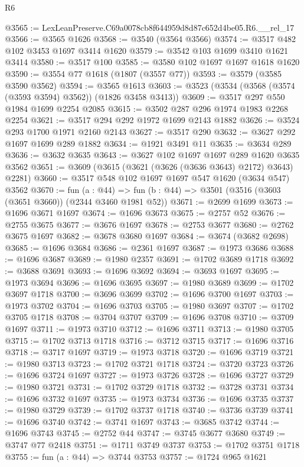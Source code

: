 \begin{lexlean}{R6}
\begin{coremodule}
@3565 := LexLeanPreserve.C69a0078cb8f644959d8d87c652d4be05.R6.__rel_17
@3566 := @3565 @1626
@3568 := @3540 (@3564 @3566)
@3574 := @3517 @482 @102 @3453 @1697 @3414 @1620
@3579 := @3542 @103 @1699 @3410 @1621 @3414
@3580 := @3517 @100
@3585 := @3580 @102 @1697 @1697 @1618 @1620
@3590 := @3554 @77 @1618 (@1807 (@3557 @77))
@3593 := @3579 (@3585 @3590 @3562)
@3594 := @3565 @1613
@3603 := @3523 (@3534 (@3568 (@3574 (@3593 @3594) @3562)) (@1826 @3458 @3413))
@3609 := @3517 @297 @550 @1984 @1699 @2254 @2085
@3615 := @3502 @287 @296 @1974 @1983 @2268 @2254
@3621 := @3517 @294 @292 @1972 @1699 @2143 @1882
@3626 := @3524 @293 @1700 @1971 @2160 @2143
@3627 := @3517 @290
@3632 := @3627 @292 @1697 @1699 @289 @1882
@3634 := @1921 @3491 @11
@3635 := @3634 @289
@3636 := @3632 @3635
@3643 := @3627 @102 @1697 @1697 @289 @1620 @3635 @3562
@3651 := @3609 (@3615 (@3621 (@3626 (@3636 @3643) @2172) @3643) @2281)
@3660 := @3517 @548 @102 @1697 @1697 @547 @1620 (@3634 @547) @3562
@3670 := fun (a : @44) =>
  fun (b : @44) => @3501 (@3516 (@3603 (@3651 @3660)) (@2344 @3460 @1981 @52))
@3671 := @2699 @1699
@3673 := @1696 @3671 @1697
@3674 := @1696 @3673
@3675 := @2757 @52
@3676 := @2755 @3675
@3677 := @3676 @1697
@3678 := @2753 @3677
@3680 := @2762 @3675 @1697
@3682 := @3678 @3680 @1697
@3684 := @3674 (@3682 @2698)
@3685 := @1696 @3684
@3686 := @2361 @1697
@3687 := @1973 @3686
@3688 := @1696 @3687
@3689 := @1980 @2357
@3691 := @1702 @3689 @1718
@3692 := @3688 @3691
@3693 := @1696 @3692
@3694 := @3693 @1697
@3695 := @1973 @3694
@3696 := @1696 @3695
@3697 := @1980 @3689
@3699 := @1702 @3697 @1718
@3700 := @3696 @3699
@3702 := @1696 @3700 @1697
@3703 := @1973 @3702
@3704 := @1696 @3703
@3705 := @1980 @3697
@3707 := @1702 @3705 @1718
@3708 := @3704 @3707
@3709 := @1696 @3708
@3710 := @3709 @1697
@3711 := @1973 @3710
@3712 := @1696 @3711
@3713 := @1980 @3705
@3715 := @1702 @3713 @1718
@3716 := @3712 @3715
@3717 := @1696 @3716
@3718 := @3717 @1697
@3719 := @1973 @3718
@3720 := @1696 @3719
@3721 := @1980 @3713
@3723 := @1702 @3721 @1718
@3724 := @3720 @3723
@3726 := @1696 @3724 @1697
@3727 := @1973 @3726
@3728 := @1696 @3727
@3729 := @1980 @3721
@3731 := @1702 @3729 @1718
@3732 := @3728 @3731
@3734 := @1696 @3732 @1697
@3735 := @1973 @3734
@3736 := @1696 @3735
@3737 := @1980 @3729
@3739 := @1702 @3737 @1718
@3740 := @3736 @3739
@3741 := @1696 @3740
@3742 := @3741 @1697
@3743 := @3685 @3742
@3744 := @1696 @3743
@3745 := @2752 @44
@3747 := @3745 @3677 @3680
@3749 := @3747 @77 @2418
@3751 := @1711 @3749 @3737
@3753 := @1702 @3751 @1718
@3755 := fun (a : @44) => @3744 @3753
@3757 := @1724 @965 @1621

\end{coremodule}
\end{lexlean}

